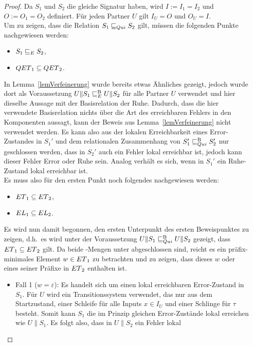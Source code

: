 \begin{proof}
  Da $S_1$ und $S_2$ die gleiche Signatur haben,
  wird $I:=I_1=I_2$ und $O:=O_1=O_2$ definiert. Für jeden Partner $U$ gilt
  $I_U=O$ und $O_U=I$.\\
  Um zu zeigen, dass die Relation $S_1\sqsubseteq _{Qui} S_2$ gilt, müssen die
  folgenden Punkte nachgewiesen werden:
  \begin{itemize}
    \item $S_1\sqsubseteq _E S_2$,
    \item $QET{}_1\subseteq QET{}_2$.
  \end{itemize}
  In Lemma~\ref{lemVerfeinerung} wurde bereits etwas Ähnliches gezeigt, jedoch
  wurde dort als Voraussetzung $U\|S_1\sqsubseteq _E^\mathrm{B} U\|S_2$ für alle Partner $U$
  verwendet und hier dieselbe Aussage mit der Basisrelation der Ruhe. Dadurch,
  dass die hier verwendete Basisrelation nichts über die Art des erreichbaren
  Fehlers in den Komponenten aussagt, kann der Beweis aus Lemma~\ref{lemVerfeinerung}
  nicht verwendet werden. Es kann also aus der lokalen Erreichbarkeit eines
  Error-Zustandes in $S_1'$ und dem relationalen Zusammenhang von $S_1'\sqsubseteq _{Qui}^\mathrm{B} S_2'$ nur
  geschlossen werden, dass in $S_2'$ auch ein Fehler lokal erreichbar ist,
  jedoch kann dieser Fehler Error oder Ruhe sein. Analog
  verhält es sich, wenn in $S_1'$ ein Ruhe-Zustand lokal erreichbar ist.\\
  Es muss also für den ersten Punkt noch folgendes nachgewiesen werden:
  \begin{itemize}
    \item $ET{}_1\subseteq ET{}_2$,
    \item $EL{}_1\subseteq EL{}_2$.
  \end{itemize}
  Es wird nun damit begonnen, den ersten Unterpunkt des ersten Beweispunktes zu
  zeigen, d.h.\ es wird unter der Voraussetzung $U\|S_1\sqsubseteq _{Qui}^\mathrm{B} U\|S_2$ gezeigt,
  dass $ET{}_1\subseteq ET{}_2$ gilt. Da beide \ET{}-Mengen
  unter \cont{} abgeschlossen sind, reicht es ein präfix-minimales Element
  $w\in ET{}_1$ zu betrachten und zu zeigen, dass dieses $w$ oder eines seiner
  Präfixe in $ET{}_2$ enthalten ist.
  \begin{itemize}
    \item Fall 1 ($w=\varepsilon$): Es handelt sich um einen lokal erreichbaren
      Error-Zustand in $S_1$. Für $U$ wird ein Transitionssystem verwendet, das nur aus
      dem Startzustand, einer Schleife für alle Inputs $x\in I_U$ und einer
      Schlinge für $\tau$ besteht. Somit kann $S_1$ die im Prinzip gleichen
      Error-Zustände lokal erreichen wie $U\|S_1$. Es folgt also, dass in $U\|S_2$ ein Fehler lokal

\end{itemize}
\end{proof}
